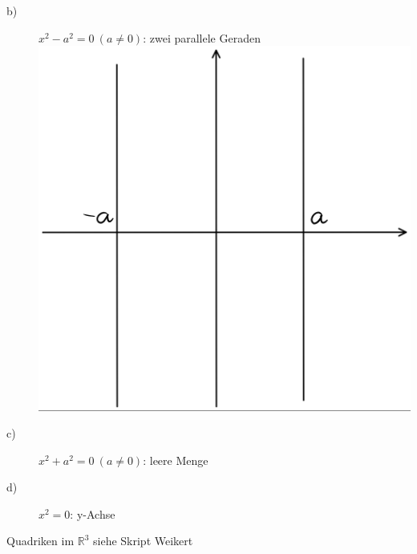 \documentclass{scrbook}
\begin{document}
\begin{description}
\begin{description}
\item[b)] $x^2 -a^2 = 0 \ (a\neq 0)$: zwei parallele Geraden
\\
\includegraphics{Satz_15_2_6.png}
\\
\item[c)] $x^2 + a^2 = 0\ (a\neq 0)$: leere Menge
\item[d)] $x^2 = 0$: y-Achse
\end{description}
\end{description}
Quadriken im $\mathbb{R}^3$ siehe Skript Weikert\\
\end{document}
